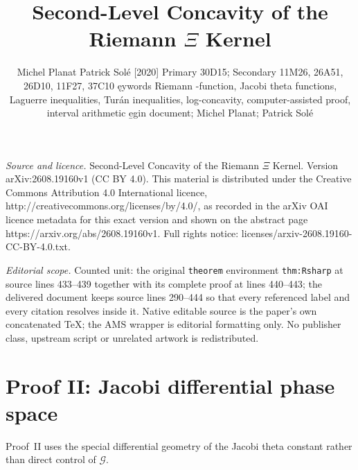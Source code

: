 \documentclass[10pt,a4paper]{amsart}
\numberwithin{equation}{section}
\newcommand{\Gcal}{\mathcal G}
\begin{document}
\title[Second-Level Concavity of the Riemann Xi Kernel]{Second-Level Concavity of the Riemann $\Xi$ Kernel}
\author{Michel Planat Patrick Solé [2020] Primary 30D15; Secondary 11M26, 26A51, 26D10, 11F27, 37C10 ęywords Riemann $ $-function, Jacobi theta functions, Laguerre inequalities, Turán inequalities, log-concavity, computer-assisted proof, interval arithmetic e̱gin document; Michel Planat; Patrick Solé}
\date{}
\maketitle
\noindent\emph{Source and licence.} Second-Level Concavity of the Riemann $\Xi$ Kernel. Version arXiv:2608.19160v1 (CC BY 4.0). This material is distributed under the Creative Commons Attribution 4.0 International licence, http://creativecommons.org/licenses/by/4.0/, as recorded in the arXiv OAI licence metadata for this exact version and shown on the abstract page https://arxiv.org/abs/2608.19160v1. Full rights notice: licenses/arxiv-2608.19160-CC-BY-4.0.txt.\par\smallskip
\noindent\textit{Editorial scope.} Counted unit: the original \texttt{theorem} environment \texttt{thm:Rsharp} at source lines 433--439 together with its complete proof at lines 440--443; the delivered document keeps source lines 290--444 so that every referenced label and every citation resolves inside it. Native editable source is the paper's own concatenated TeX; the AMS wrapper is editorial formatting only. No publisher class, upstream script or unrelated artwork is redistributed.
\section{Proof II: Jacobi differential phase space}
Proof~II uses the special differential geometry of the Jacobi theta constant rather than direct control of $\Gcal$.
\end{document}
